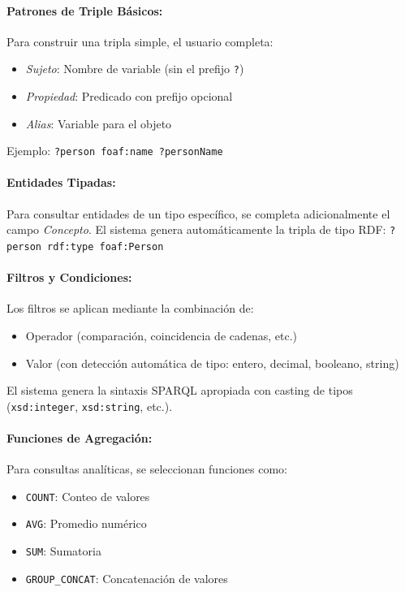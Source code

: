 \documentclass{article}
\begin{document}
\paragraph{Patrones de Triple Básicos:}
Para construir una tripla simple, el usuario completa:
\begin{itemize}
    \item \textit{Sujeto}: Nombre de variable (sin el prefijo \texttt{?})
    \item \textit{Propiedad}: Predicado con prefijo opcional
    \item \textit{Alias}: Variable para el objeto
\end{itemize}

Ejemplo: \texttt{?person foaf:name ?personName}

\paragraph{Entidades Tipadas:}
Para consultar entidades de un tipo específico, se completa adicionalmente el campo \textit{Concepto}. El sistema genera automáticamente la tripla de tipo RDF: \texttt{?person rdf:type foaf:Person}

\paragraph{Filtros y Condiciones:}
Los filtros se aplican mediante la combinación de:
\begin{itemize}
    \item Operador (comparación, coincidencia de cadenas, etc.)
    \item Valor (con detección automática de tipo: entero, decimal, booleano, string)
\end{itemize}

El sistema genera la sintaxis SPARQL apropiada con casting de tipos (\texttt{xsd:integer}, \texttt{xsd:string}, etc.).

\paragraph{Funciones de Agregación:}
Para consultas analíticas, se seleccionan funciones como:
\begin{itemize}
    \item \texttt{COUNT}: Conteo de valores
    \item \texttt{AVG}: Promedio numérico
    \item \texttt{SUM}: Sumatoria
    \item \texttt{GROUP\_CONCAT}: Concatenación de valores
\end{itemize}
\end{document}
